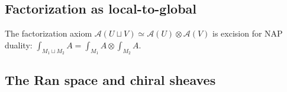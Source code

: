 \subsection{Factorization as local-to-global}

\begin{remark}\label{rem:factorization-locality}
The factorization axiom $\mathcal{A}(U \sqcup V) \simeq \mathcal{A}(U) \otimes \mathcal{A}(V)$ is excision for NAP duality: $\int_{M_1 \sqcup M_2} A = \int_{M_1} A \otimes \int_{M_2} A$.
\end{remark}

\subsection{The Ran space and chiral sheaves}
\label{subsec:ran-universal}

